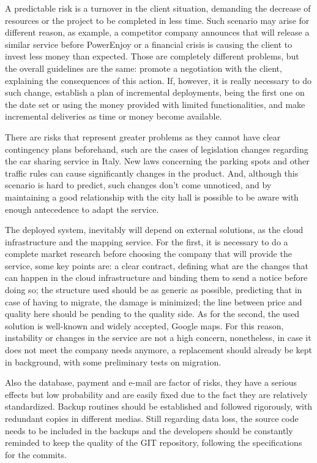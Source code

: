 \documentclass[a4paper]{article}
\begin{document}
A predictable risk is a turnover in the client situation, demanding the decrease of resources or the project to be completed in less time. Such scenario may arise for different reason, as example, a competitor company announces that will release a similar service before PowerEnjoy or a financial crisis is causing the client to invest less money than expected. Those are completely different problems, but the overall guidelines are the same: promote a negotiation with the client, explaining the consequences of this action. If, however, it is really necessary to do such change, establish a plan of incremental deployments, being the first one on the date set or using the money provided with limited functionalities, and make incremental deliveries as time or money become available.   

There are risks that represent greater problems as they cannot have clear contingency plans beforehand, such are the cases of legislation changes regarding the car sharing service in Italy.  New laws concerning the parking spots and other traffic rules can cause significantly changes in the product. And, although this scenario is hard to predict, such changes don’t come unnoticed, and by maintaining a good relationship with the city hall is possible to be aware with enough antecedence to adapt the service. 

The deployed system, inevitably will depend on external solutions, as the cloud infrastructure and the mapping service. For the first, it is necessary to do a complete market research before choosing the company that will provide the service, some key points are: a clear contract, defining what are the changes that can happen in the cloud infrastructure and binding them to send a notice before doing so; the structure used should be as generic as possible, predicting that in case of having to migrate, the damage is minimized; the line between price and quality here should be pending to the quality side. As for the second, the used solution is well-known and widely accepted, Google maps. For this reason, instability or changes in the service are not a high concern, nonetheless, in case it does not meet the company needs anymore, a replacement should already be kept in background, with some preliminary tests on migration. 

Also the database, payment and e-mail are factor of risks, they have a serious effects but low probability and are easily fixed due to the fact they are relatively standardized. Backup routines should be established and followed rigorously, with redundant copies in different medias. Still regarding data loss,  the source code needs to be included in the backups and the developers should be constantly reminded to keep the quality of the GIT repository, following the specifications for the commits.  
\end{document}
